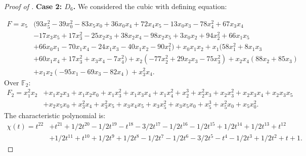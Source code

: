 \documentclass[12pt]{amsart}
\numberwithin{equation}{section}
\theoremstyle{plain}
\theoremstyle{remark}
\theoremstyle{definition}
\newcommand{\bF}{\mathbb{F}}
\begin{document}
\begin{proof}[Proof of ]
\noindent\textbf{Case 2: $D_6$.} We considered the cubic with defining equation:

\begin{equation}\label{ex: D6} 
\begin{split}   F =  x_5&(93x_5^2 -39x_0^2- 83x_5x_0+ 36x_0x_4 + 72x_4x_5- 13x_0x_3 - 78x_4^2 + 67x_3x_4 \\
    &- 17x_3x_5 + 17x_3^2- 25x_2x_3 + 38x_2x_4 - 98x_2x_5 + 3x_0x_2+ 94x_2^2+ 66x_1x_5 \\
    &+ 66x_0x_1- 70x_1x_4- 24x_1x_3- 40x_1x_2- 90x_1^2)+ x_0x_1x_2+ x_1(58x_1^2+ 8x_1x_3 \\
    &+ 60x_1x_4+ 17x_3^2 + x_3x_4  - 7x_4^2)+x_2(- 77x_2^2 + 29x_2x_3- 75x_3^2)+x_2x_4(88x_2+85x_3)\\
    &+x_1x_2(- 95x_1 - 69x_3 - 82x_4)+ x_3^2x_4 .
    \end{split}
\end{equation}
Over $\bF_2:$
\begin{align*}
    F_2 = x_1^2x_2 &+ x_1x_2x_3 + x_1x_2x_0 + x_1x_3^2 + x_1x_3x_4 + x_1x_4^2 + x_2^3 + x_2^2x_3 + x_2x_3^2 + x_2x_3x_4 + x_2x_3x_5 \\
    &+ x_2x_5x_0 + x_3^2x_4 + x_3^2x_5 + x_3x_4x_5 + x_3x_5^2 + x_3x_5x_0 + x_5^3 + x_5^2x_0 + x_5x_0^2.
\end{align*}
The characteristic polynomial is:
\begin{align*} 
\chi(t) = t^{22}& + t^{21} + 1/2t^{20} - 1/2t^{19} - t^{18} - 3/2t^{17} - 1/2t^{16} - 1/2t^{15} + 1/2t^{14} + 1/2t^{13} + t^{12} \\&+ 1/2t^{11}
+ t^{10} + 1/2t^{9} 
+ 1/2t^8 - 1/2t^7 - 1/2t^6 - 3/2t^5 - t^4 - 1/2t^3 + 1/2t^2 + t + 1.
\end{align*}


\end{proof}
\end{document}
